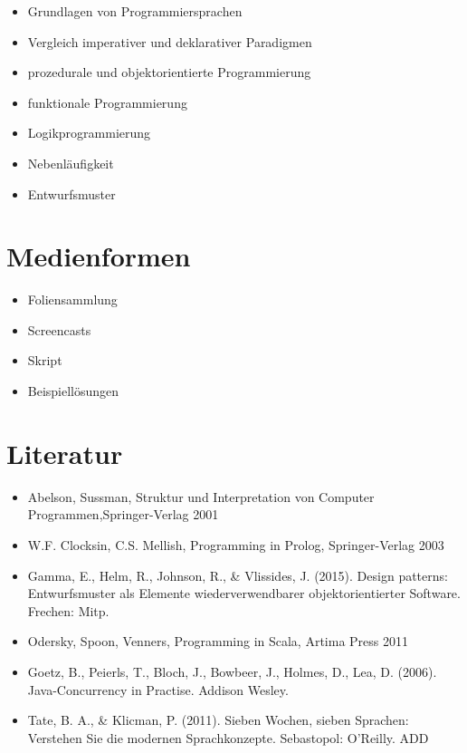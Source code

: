 \begin{itemize}
\tightlist
\item
  Grundlagen von Programmiersprachen
\item
  Vergleich imperativer und deklarativer Paradigmen
\item
  prozedurale und objektorientierte Programmierung
\item
  funktionale Programmierung
\item
  Logikprogrammierung
\item
  Nebenläufigkeit
\item
  Entwurfsmuster
\end{itemize}

\hypertarget{medienformenpathlabelmi-2017modulbeschreibungen-bachelorba_paradigmen-der-programmierung}{%
\section*{Medienformen\label{/mi-2017/modulbeschreibungen-bachelor/BA_Paradigmen-der-Programmierung}}\label{medienformenpathlabelmi-2017modulbeschreibungen-bachelorba_paradigmen-der-programmierung}}

\begin{itemize}
\tightlist
\item
  Foliensammlung
\item
  Screencasts
\item
  Skript
\item
  Beispiellösungen
\end{itemize}

\hypertarget{literaturpathlabelmi-2017modulbeschreibungen-bachelorba_paradigmen-der-programmierung}{%
\section*{Literatur\label{/mi-2017/modulbeschreibungen-bachelor/BA_Paradigmen-der-Programmierung}}\label{literaturpathlabelmi-2017modulbeschreibungen-bachelorba_paradigmen-der-programmierung}}

\begin{itemize}
\tightlist
\item
  Abelson, Sussman, Struktur und Interpretation von Computer
  Programmen,Springer-Verlag 2001
\item
  W.F. Clocksin, C.S. Mellish, Programming in Prolog, Springer-Verlag
  2003
\item
  Gamma, E., Helm, R., Johnson, R., \& Vlissides, J. (2015). Design
  patterns: Entwurfsmuster als Elemente wiederverwendbarer
  objektorientierter Software. Frechen: Mitp.
\item
  Odersky, Spoon, Venners, Programming in Scala, Artima Press 2011
\item
  Goetz, B., Peierls, T., Bloch, J., Bowbeer, J., Holmes, D., Lea, D.
  (2006). Java-Concurrency in Practise. Addison Wesley.
\item
  Tate, B. A., \& Klicman, P. (2011). Sieben Wochen, sieben Sprachen:
  Verstehen Sie die modernen Sprachkonzepte. Sebastopol: O'Reilly. ADD
\end{itemize}

